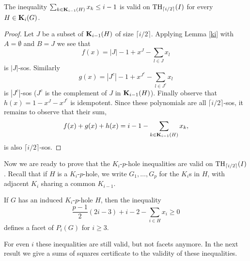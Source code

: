 \begin{corollary} \label{frac}
The inequality $\sum_{k \in \mathbf{K}_{i-1}(H)}x_k \le i-1$ is valid on $\textup{TH}_{\lceil i/2 \rceil}(I)$ for every $H \in \mathbf{K}_i(G)$.
\end{corollary}
\begin{proof}
Let $J$ be a subset of $\mathbf{K}_{i-1}(H)$ of size $\lceil i/2 \rceil$. Applying Lemma \ref{ki} with 
$A=\emptyset$ and $B=J$ we see that 
 $$ f(x) =  |J|-1 + x^J - \sum_{l \in J} x_l $$ is $|J|$-sos. Similarly 
$$g(x)= |J^c|-1 + x^{J^c} - \sum_{l \in J^c} x_l $$ is $|J^c|$-sos ($J^c$ is the complement of $J$ in $\mathbf{K}_{i-1}(H)$). Finally observe that 
$h(x) = 1 - x^J - x^{J^c}$ is idempotent. Since these polynomials are all $\lceil i/2 \rceil$-sos, it remains to observe that their sum,
$$f(x)+g(x)+h(x)=i-1-\sum_{k \in \mathbf{K}_{i-1}(H)}x_k,$$
is also $\lceil i/2 \rceil$-sos.
\end{proof}

Now we are ready to prove that the $K_i$-$p$-hole inequalities are valid on $\textup{TH}_{\lceil i/2 \rceil}(I)$. Recall that if $H$ is a $K_i$-$p$-hole, we write $G_1,\ldots,G_p$ for the $K_i$s in $H$, with adjacent $K_i$ sharing a common $K_{i-1}$. 

\begin{theorem} \cite[Theorem 3.4]{conforti}
If $G$ has an induced $K_i$-$p$-hole $H$, then the inequality
$$\frac{p-1}{2} (2i-3)+i-2 - \sum_{i \in H} x_i \geq 0$$
defines a facet of $P_i(G)$ for $i \ge 3$.
\end{theorem}

For even $i$ these  inequalities are still valid, but not facets anymore. In the next result we give a sums of squares certificate to
the validity of these inequalities.

